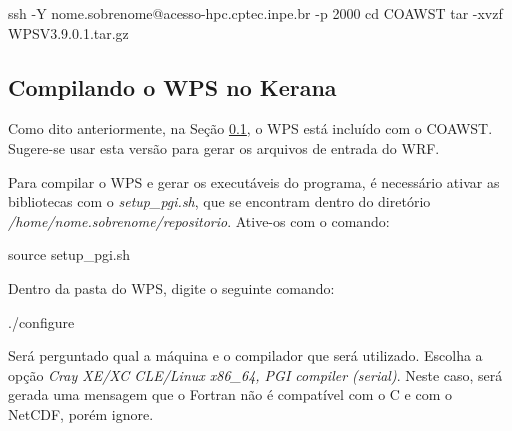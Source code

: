 \begin{bashcode}
ssh -Y nome.sobrenome@acesso-hpc.cptec.inpe.br -p 2000
cd COAWST
tar -xvzf WPSV3.9.0.1.tar.gz
\end{bashcode}
\bigskip

\subsection{Compilando o WPS no Kerana}\label{wpsker}
\bigskip

\begin{tcolorbox}[enhanced,
  grow to left by=0cm,%
  grow to right by=0cm,%
  enlarge top by=0cm,%
  enlarge bottom by=0cm,%
  tcbox raise base,
  boxrule=1.0pt,
  left=18mm,
  colframe=red!50!black,coltext=red!25!black,colback=red!10!white,
  overlay={\begin{tcbclipinterior}\fill[red!75!blue!50!white] (frame.south west)
    rectangle node[text=white,font=\sffamily\bfseries\footnotesize,rotate=0] {ATENÇÃO} ([xshift=18mm]frame.north west);\end{tcbclipinterior}}]
Como dito anteriormente, na Seção \textcolor{bleu_cite}{\ref{wpsker}}, o WPS está incluído com o COAWST. Sugere-se usar esta versão para gerar os arquivos de entrada do WRF.
\end{tcolorbox}
\bigskip

\noindent Para compilar o WPS e gerar os executáveis do programa, é necessário ativar as bibliotecas com o \textit{setup\_pgi.sh}, 
          que se encontram dentro do diretório \textit{/home/nome.sobrenome/repositorio}. Ative-os com o comando:
\bigskip

\begin{bashcode}
source setup_pgi.sh
\end{bashcode}
\bigskip

\noindent Dentro da pasta do WPS, digite o seguinte comando:
\bigskip

\begin{bashcode}
./configure
\end{bashcode}
\bigskip

\noindent Será perguntado qual a máquina e o compilador que será utilizado. Escolha a opção \textit{Cray XE/XC CLE/Linux x86\_64, PGI compiler (serial)}. Neste caso, será gerada uma mensagem que o Fortran não é compatível com o C e com o NetCDF, porém ignore.
\bigskip

